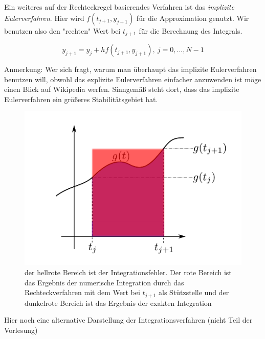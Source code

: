 \documentclass[10pt,a4paper]{article}
\begin{document}
Ein weiteres auf der Rechteckregel basierendes Verfahren ist das \emph{implizite Eulerverfahren}. Hier wird $f(t_{j+1},y_{j+1})$ für die Approximation genutzt. Wir benutzen also den "rechten" Wert bei $t_{j+1}$ für die Berechnung des Integrals.

\begin{defi}
\begin{equation*}
y_{j+1}=y_j+hf(t_{j+1},y_{j+1}), ~j=0,...,N-1
\end{equation*}

Anmerkung: Wer sich fragt, warum man überhaupt das implizite Eulerverfahren benutzen will, obwohl das explizite Eulerverfahren einfacher anzuwenden ist möge einen Blick auf Wikipedia werfen. Sinngemäß steht dort, dass das implizite Eulerverfahren ein größeres Stabilitätsgebiet hat.
\end{defi}

\begin{figure}[H]
\includegraphics[width=\textwidth]{images/rechteckformel-rechts}
\caption{der hellrote Bereich ist der Integrationsfehler. Der rote Bereich ist das Ergebnis der numerische Integration durch das Rechteckverfahren mit dem Wert bei $t_{j+1}$ als Stützstelle und der dunkelrote Bereich ist das Ergebnis der exakten Integration}
\end{figure}

Hier noch eine alternative Darstellung der Integrationsverfahren (nicht Teil der Vorlesung)
\end{document}
